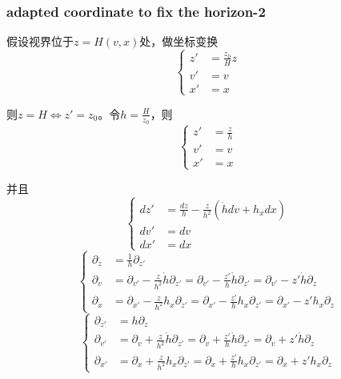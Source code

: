 \documentclass[12pt,a4paper]{ctexart}
\numberwithin{equation}{section}
\begin{document}
\subsubsection{adapted coordinate to fix the horizon-2}

假设视界位于$z=H(v,x)$处，做坐标变换
\begin{equation}
    \left\{
        \begin{aligned}
            z'&=\frac{z_0}{H}z\\
            v'&=v\\
            x'&=x
        \end{aligned}
    \right.
\end{equation}

则$z=H\Leftrightarrow z'=z_0$。令$h=\frac{H}{z_0}$，则
\begin{equation}
    \left\{
        \begin{aligned}
            z'&=\frac{z}{h}\\
            v'&=v\\
            x'&=x
        \end{aligned}
    \right.
\end{equation}

并且
\begin{equation}
    \left\{
        \begin{aligned}
            dz'&=\frac{dz}{h}-\frac{z}{h^2}(\dot{h}dv+h_xdx)\\
            dv'&=dv\\
            dx'&=dx
        \end{aligned}
    \right.
\end{equation}
\begin{equation}
    \left\{
        \begin{aligned}
            \partial_z&=\frac{1}{h}\partial_{z'}\\
            \partial_v&=\partial_{v'}-\frac{z}{h^2}\dot{h}\partial_{z'}=\partial_{v'}-\frac{z'}{h}\dot{h}\partial_{z'}=\partial_{v'}-z'\dot{h}\partial_z\\
            \partial_x&=\partial_{x'}-\frac{z}{h^2}h_x\partial_{z'}=\partial_{x'}-\frac{z'}{h}h_x\partial_{z'}=\partial_{x'}-z'h_x\partial_z
        \end{aligned}
    \right.
\end{equation}
\begin{equation}
    \left\{
        \begin{aligned}
            \partial_{z'}&=h\partial_z\\
            \partial_{v'}&=\partial_v+\frac{z}{h^2}\dot{h}\partial_{z'}=\partial_v+\frac{z'}{h}\dot{h}\partial_{z'}=\partial_v+z'\dot{h}\partial_z\\
            \partial_{x'}&=\partial_x+\frac{z}{h^2}h_x\partial_{z'}=\partial_x+\frac{z'}{h}h_x\partial_{z'}=\partial_x+z'h_x\partial_z
        \end{aligned}
    \right.
\end{equation}
\end{document}
